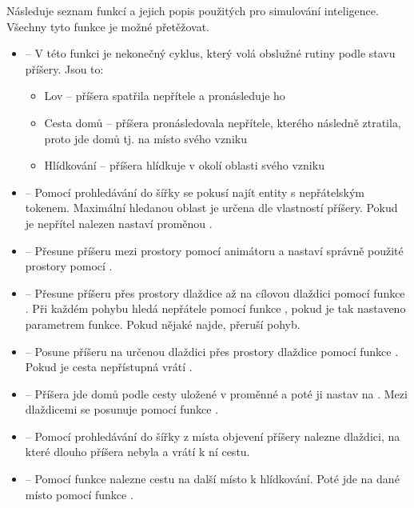 Následuje seznam funkcí a jejich popis použitých pro simulování inteligence. Všechny tyto funkce je možné přetěžovat.
\begin{itemize}

\item {} -- V této funkci je nekonečný cyklus, který volá obslužné rutiny podle stavu příšery. Jsou to:
	\begin{itemize}
    \item Lov -- příšera spatřila nepřítele a pronásleduje ho 
    \item Cesta domů -- příšera pronásledovala nepřítele, kterého následně ztratila, proto jde domů tj. na místo svého vzniku
    \item Hlídkování -- příšera hlídkuje v okolí oblasti svého vzniku
	\end{itemize}

\item {} -- Pomocí prohledávání do šířky se pokusí najít entity s nepřátelským tokenem. Maximální hledanou oblast
je určena dle vlastností příšery. Pokud je nepřítel nalezen nastaví proměnou .

\item {} -- Přesune příšeru mezi prostory pomocí animátoru a nastaví správně použité prostory pomocí .

\item {} -- Přesune příšeru přes prostory dlaždice až na cílovou dlaždici pomocí funkce . Při každém pohybu hledá nepřátele
pomocí funkce , pokud je tak nastaveno parametrem funkce. Pokud nějaké najde, přeruší pohyb.

\item {} -- Posune příšeru na určenou dlaždici přes prostory dlaždice pomocí funkce .
 Pokud je cesta nepřístupná vrátí .

\item {} -- Příšera jde domů podle cesty uložené v proměnné  a poté ji nastav na . 
         Mezi dlaždicemi se posunuje pomocí funkce .

\item {} -- Pomocí prohledávání do šířky z místa objevení příšery nalezne dlaždici, na které dlouho
příšera nebyla a vrátí k ní cestu.

\item {} -- Pomocí funkce  nalezne cestu na další místo k hlídkování. Poté jde na dané místo
 pomocí funkce .


\end{itemize}
